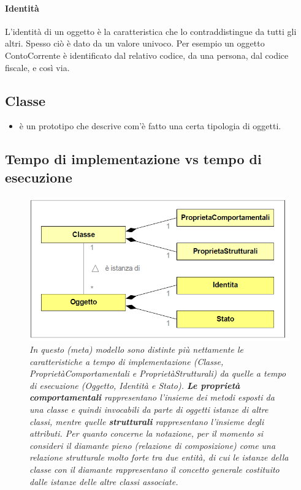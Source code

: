 \paragraph{Identità}

 \noindent L'identità di un oggetto è la caratteristica che lo contraddistingue da tutti gli altri. Spesso ciò è dato da un valore univoco. Per esempio un oggetto ContoCorrente è identificato dal relativo codice, da una persona, dal codice fiscale, e così via.

 \subsection{Classe}
 \begin{itemize}
\item è un prototipo che descrive com'è fatto una certa tipologia di oggetti.
 \end{itemize}
 
 \subsection{Tempo di implementazione vs tempo di esecuzione}
  \begin{figure}[H]
\includegraphics[scale=0.7]{images/esecuzioneVSimplementazione}
\caption{\textit{In questo (meta) modello sono distinte più nettamente le caratteristiche a tempo di implementazione (Classe, ProprietàComportamentali e ProprietàStrutturali) da quelle a tempo di esecuzione (Oggetto, Identità e Stato). \textbf{Le proprietà comportamentali} rappresentano l'insieme dei metodi esposti da una classe e quindi invocabili da parte di oggetti istanze di altre classi, mentre quelle \textbf{strutturali} rappresentano l'insieme degli attributi. Per quanto concerne la notazione, per il momento si consideri il diamante pieno (relazione di composizione) come una relazione strutturale molto forte tra due entità, di cui le istanze della classe con il diamante rappresentano il concetto generale costituito dalle istanze delle altre classi associate.}\label{fig:ered0}}
\end{figure}


